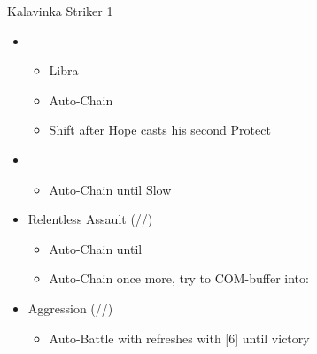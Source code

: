 	\renewcommand{\third}{[3] Relentless Assault (\rav/\rav/\com)}
	\renewcommand{\fourth}{[4] Relentless Assault (\rav/\rav/\com)}
	\renewcommand{\fifth}{[5] Aggression (\com/\rav/\com)}
	\begin{battle}[0:52]{Kalavinka Striker 1}
		\begin{itemize}
			\item \first
			      \begin{itemize}
				      \item Libra
				      \item Auto-Chain
				      \item Shift after Hope casts his second Protect
			      \end{itemize}
			\item \second
			      \begin{itemize}
				      \item Auto-Chain until Slow
			      \end{itemize}
			\item \fourth
			      \begin{itemize}
				      \item Auto-Chain until \stagger
				      \item Auto-Chain once more, try to COM-buffer into:
			      \end{itemize}
			\item \fifth
			      \begin{itemize}
				      \item Auto-Battle with refreshes with [6] until victory
			      \end{itemize}
		\end{itemize}
	\end{battle}
	\vfill

